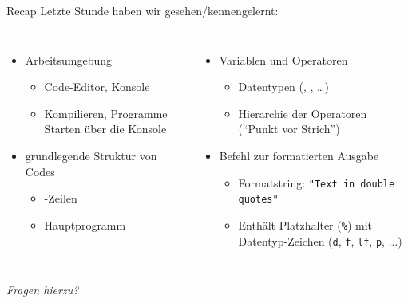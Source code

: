 
\begin{frame}[t,plain]
\titlepage
\end{frame}


\begin{frame}[fragile]{Recap}
%
Letzte Stunde haben wir gesehen/kennengelernt:
%
\begin{columns}[T]
\begin{itemize}
\item Arbeitsumgebung
	\begin{itemize}
	\item Code-Editor, Konsole
	\item Kompilieren, Programme Starten über die Konsole
	\end{itemize}
\item grundlegende Struktur von Codes
	\begin{itemize}
	\item {}-Zeilen
	\item Hauptprogramm 
	\end{itemize}
\end{itemize}
%
\begin{itemize}
\item Variablen und Operatoren
	\begin{itemize}
	\item Datentypen (\zB {}, , \ldots)
	\item Hierarchie der Operatoren (\enquote{Punkt vor Strich})
	\end{itemize}
\item Befehl  zur formatierten Ausgabe\\
	\begin{itemize}
	\item Formatstring: \texttt{"Text in double quotes"}\\
	\item Enthält Platzhalter (\texttt{\%}) mit Datentyp-Zeichen (\texttt{d}, \texttt{f}, \texttt{lf}, \texttt{p}, ...)
	\end{itemize}
\end{itemize}
\end{columns}
%
\begin{center}
\emph{Fragen hierzu?}
\end{center}
%
\end{frame}

